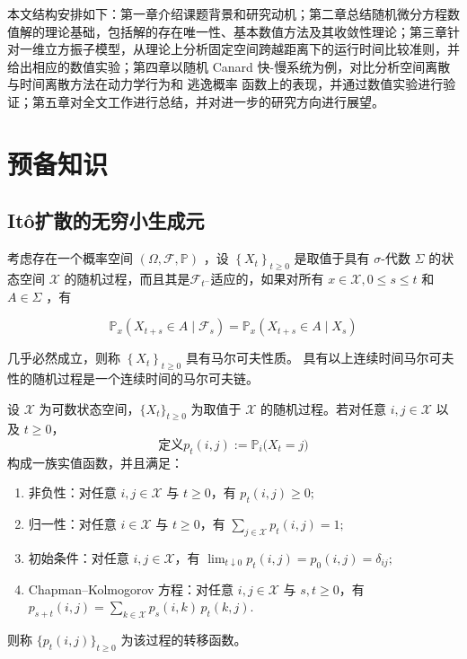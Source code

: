 	本文结构安排如下：第一章介绍课题背景和研究动机；第二章总结随机微分方程数值解的理论基础，包括解的存在唯一性、基本数值方法及其收敛性理论；第三章针对一维立方振子模型，从理论上分析固定空间跨越距离下的运行时间比较准则，并给出相应的数值实验；第四章以随机 Canard 快-慢系统为例，对比分析空间离散与时间离散方法在动力学行为和 逃逸概率 函数上的表现，并通过数值实验进行验证；第五章对全文工作进行总结，并对进一步的研究方向进行展望。
	
	
	\newpage
	
	
	 \section{预备知识}
	 
	 
	

	\subsection{It\^{o}扩散的无穷小生成元}
	
	 \begin{definition}[马尔可夫过程] 
	 考虑存在一个概率空间 $(\Omega, \mathcal{F}, \mathbb{P})$ ，设 $\left\{X_{t}\right\}_{t \geq 0}$ 是取值于具有 $\sigma$-代数 $\Sigma$ 的状态空间 $\mathcal{X}$ 的随机过程，而且其是$\mathcal{F}_{t^{-}}$适应的，如果对所有 $x \in \mathcal{X}, 0 \leq s \leq t$ 和 $A \in \Sigma$ ，有
	
	 $$
	 \mathbb{P}_{x}\left(X_{t+s} \in A \mid \mathcal{F}_{s}\right)=\mathbb{P}_{x}\left(X_{t+s} \in A \mid X_{s}\right)
	 $$
	
	 几乎必然成立，则称 $\left\{X_{t}\right\}_{t \geq 0}$ 具有马尔可夫性质。
	 具有以上连续时间马尔可夫性的随机过程是一个连续时间的马尔可夫链。
	 \end{definition}
	
	 
	 \begin{definition}[转移函数]
	 	设 $\mathcal{X}$ 为可数状态空间，$\{X_t\}_{t\ge0}$ 为取值于 $\mathcal{X}$ 的随机过程。若对任意 $i,j\in\mathcal{X}$ 以及 $t\ge0$，
	 	\[
	 	定义p_t(i,j) := \mathbb{P}_i\bigl(X_t = j\bigr)
	 	\]
	 	构成一族实值函数，并且满足：
	 	\begin{enumerate}
	 		\item[(i)] 非负性：对任意 $i,j\in\mathcal{X}$ 与 $t\ge0$，有
	 		\( 	p_t(i,j) \ge 0; \)
	 		\item[(ii)] 归一性：对任意 $i\in\mathcal{X}$ 与 $t\ge0$，有
	 		\(\sum_{j\in\mathcal{X}} p_t(i,j) = 1;\)
	 		\item[(iii)] 初始条件：对任意 $i,j\in\mathcal{X}$，有
	 		\(\lim_{t\downarrow 0} p_t(i,j) = p_0(i,j) = \delta_{ij};\)
	 		\item[(iv)] Chapman--Kolmogorov 方程：对任意 $i,j\in\mathcal{X}$ 与 $s,t\ge0$，有
	 		\(p_{s+t}(i,j) = \sum_{k\in\mathcal{X}} p_s(i,k)\,p_t(k,j).	\)
	 	\end{enumerate}
	 	则称 $\{p_t(i,j)\}_{t\ge0}$ 为该过程的转移函数。
	 \end{definition}
	 

